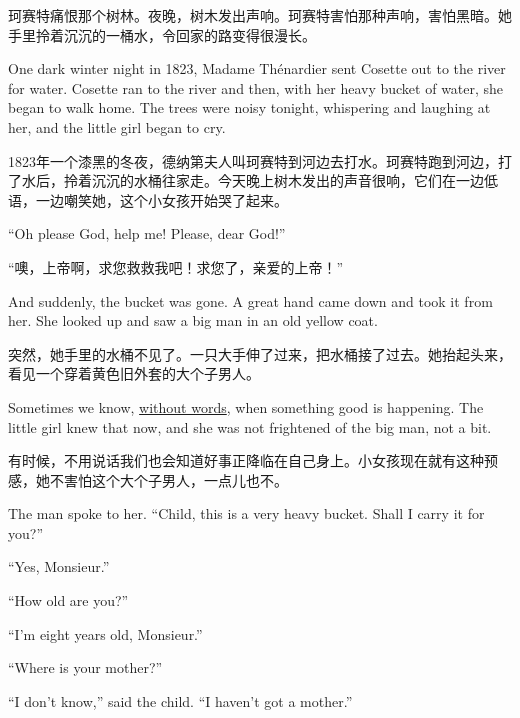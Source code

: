\documentclass[fontset=ubuntu, zihao=5]{ctexart}
\begin{document}
\begin{paracol}{2}
  \switchcolumn

  珂赛特痛恨那个树林。夜晚，树木发出声响。珂赛特害怕那种声响，害怕黑暗。她手里拎着沉沉的一桶水，令回家的路变得很漫长。

  \switchcolumn*

  One dark winter night in 1823, Madame Thénardier sent Cosette out to the river for water. Cosette ran to the river and then, with her heavy bucket of water, she began to walk home. The trees were noisy tonight, whispering and laughing at her, and the little girl began to cry.

  \switchcolumn

  1823年一个漆黑的冬夜，德纳第夫人叫珂赛特到河边去打水。珂赛特跑到河边，打了水后，拎着沉沉的水桶往家走。今天晚上树木发出的声音很响，它们在一边低语，一边嘲笑她，这个小女孩开始哭了起来。


  \switchcolumn*

  ``Oh please God, help me! Please, dear God!''

  \switchcolumn

  “噢，上帝啊，求您救救我吧！求您了，亲爱的上帝！”

  \switchcolumn*

  And suddenly, the bucket was gone. A great hand came down and took it from her. She looked up and saw a big man in an old yellow coat.

  \switchcolumn

  突然，她手里的水桶不见了。一只大手伸了过来，把水桶接了过去。她抬起头来，看见一个穿着黄色旧外套的大个子男人。

  \switchcolumn*

  Sometimes we know, \uline{without words}, when something good is happening.
  The little girl knew that now, and she was not frightened of the big man, not
  a bit.

  \switchcolumn

  有时候，不用说话我们也会知道好事正降临在自己身上。小女孩现在就有这种预感，她不害怕这个大个子男人，一点儿也不。

  \switchcolumn*

  The man spoke to her. ``Child, this is a very heavy bucket. Shall I carry it for you?''


  ``Yes, Monsieur.''


  ``How old are you?''


  ``I'm eight years old, Monsieur.''


  ``Where is your mother?''


  ``I don't know,'' said the child. ``I haven't got a mother.''



\end{paracol}
\end{document}
